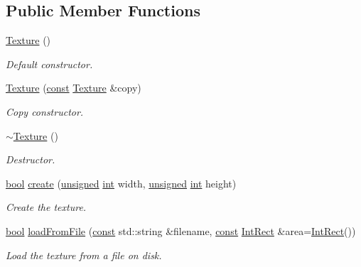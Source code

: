 \subsection*{Public Member Functions}
\begin{DoxyCompactItemize}
\item 
\hyperlink{classsf_1_1_texture_a3e04674853b8533bf981db3173e3a4a7}{Texture} ()
\begin{DoxyCompactList}\small\item\em Default constructor. \end{DoxyCompactList}\item 
\hyperlink{classsf_1_1_texture_a524855cbf89de3b74be84d385fd229de}{Texture} (\hyperlink{term__entry_8h_a57bd63ce7f9a353488880e3de6692d5a}{const} \hyperlink{classsf_1_1_texture}{Texture} \&copy)
\begin{DoxyCompactList}\small\item\em Copy constructor. \end{DoxyCompactList}\item 
\hyperlink{classsf_1_1_texture_a9c5354ad40eb1c5aeeeb21f57ccd7e6c}{$\sim$\-Texture} ()
\begin{DoxyCompactList}\small\item\em Destructor. \end{DoxyCompactList}\item 
\hyperlink{term__entry_8h_a002004ba5d663f149f6c38064926abac}{bool} \hyperlink{classsf_1_1_texture_a89b4c7d204acf1033c3a1b6e0a3ad0a3}{create} (\hyperlink{curses_8priv_8h_aca40206900cfc164654362fa8d4ad1e6}{unsigned} \hyperlink{term__entry_8h_ad65b480f8c8270356b45a9890f6499ae}{int} width, \hyperlink{curses_8priv_8h_aca40206900cfc164654362fa8d4ad1e6}{unsigned} \hyperlink{term__entry_8h_ad65b480f8c8270356b45a9890f6499ae}{int} height)
\begin{DoxyCompactList}\small\item\em Create the texture. \end{DoxyCompactList}\item 
\hyperlink{term__entry_8h_a002004ba5d663f149f6c38064926abac}{bool} \hyperlink{classsf_1_1_texture_a8e1b56eabfe33e2e0e1cb03712c7fcc7}{load\-From\-File} (\hyperlink{term__entry_8h_a57bd63ce7f9a353488880e3de6692d5a}{const} std\-::string \&filename, \hyperlink{term__entry_8h_a57bd63ce7f9a353488880e3de6692d5a}{const} \hyperlink{namespacesf_a1b1279ab06950b96686cffaacb72fed5}{Int\-Rect} \&area=\hyperlink{namespacesf_a1b1279ab06950b96686cffaacb72fed5}{Int\-Rect}())
\begin{DoxyCompactList}\small\item\em Load the texture from a file on disk. \end{DoxyCompactList}\item 

\end{DoxyCompactItemize}
